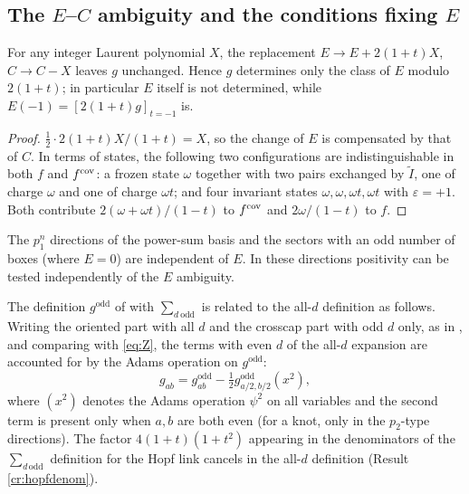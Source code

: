 \subsection{The \texorpdfstring{$E$--$C$}{E-C} ambiguity and the conditions fixing $E$}\label{sec:Econd}
\begin{proposition}\label{prop:EC}
For any integer Laurent polynomial $X$, the replacement $E \to E + 2(1+t)X$, $C \to C - X$ leaves $g$ unchanged. Hence $g$ determines only the class of $E$ modulo $2(1+t)$; in particular $E$ itself is not determined, while $E(-1) = [2(1+t)g]_{t=-1}$ is.
\end{proposition}
\begin{proof}
$\tfrac12 \cdot 2(1+t)X/(1+t) = X$, so the change of $E$ is compensated by that of $C$. In terms of states, the following two configurations are indistinguishable in both $f$ and $f^{\mathrm{cov}}$: a frozen state $\omega$ together with two pairs exchanged by $\tilde I$, one of charge $\omega$ and one of charge $\omega t$; and four invariant states $\omega, \omega, \omega t, \omega t$ with $\varepsilon = +1$. Both contribute $2(\omega + \omega t)/(1-t)$ to $f^{\mathrm{cov}}$ and $2\omega/(1-t)$ to $f$.
\end{proof}
\begin{corollary}\label{cor:Efree}
The $p_1^n$ directions of the power-sum basis and the sectors with an odd number of boxes (where $E = 0$) are independent of $E$. In these directions positivity can be tested independently of the $E$ ambiguity.
\end{corollary}

The definition $g^{\mathrm{odd}}$ of \cite{Marino09} with $\sum_{d\ \mathrm{odd}}$ is related to the all-$d$ definition as follows. Writing the oriented part with all $d$ and the crosscap part with odd $d$ only, as in \cite{Marino09}, and comparing with \eqref{eq:Z}, the terms with even $d$ of the all-$d$ expansion are accounted for by the Adams operation on $g^{\mathrm{odd}}$:
\begin{equation}\label{eq:odd}
g_{ab} = g^{\mathrm{odd}}_{ab} - \tfrac12 g^{\mathrm{odd}}_{a/2, b/2}(x^2),
\end{equation}
where $(x^2)$ denotes the Adams operation $\psi^2$ on all variables and the second term is present only when $a, b$ are both even (for a knot, only in the $p_2$-type directions). The factor $4(1+t)(1+t^2)$ appearing in the denominators of the $\sum_{d\,\mathrm{odd}}$ definition for the Hopf link cancels in the all-$d$ definition (Result \ref{cr:hopfdenom}).

